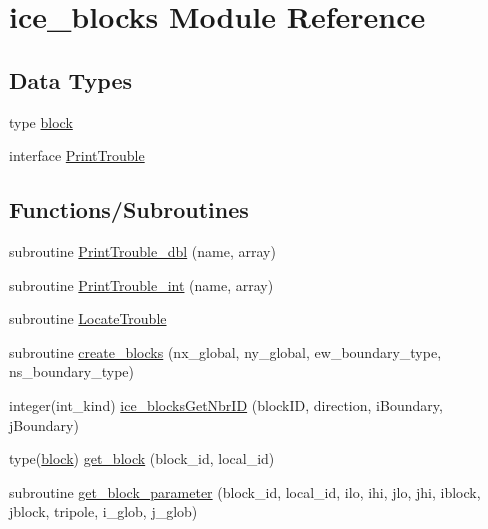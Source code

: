 \hypertarget{namespaceice__blocks}{
\section{ice\_\-blocks Module Reference}
\label{namespaceice__blocks}
}
\subsection*{Data Types}
\begin{DoxyCompactItemize}
\item 
type \hyperlink{typeice__blocks_1_1block}{block}
\item 
interface \hyperlink{interfaceice__blocks_1_1PrintTrouble}{PrintTrouble}
\end{DoxyCompactItemize}
\subsection*{Functions/Subroutines}
\begin{DoxyCompactItemize}
\item 
subroutine \hyperlink{namespaceice__blocks_a844c65de0acaeb5796d6ce421b70c5c2}{PrintTrouble\_\-dbl} (name, array)
\item 
subroutine \hyperlink{namespaceice__blocks_a4a82607c32a256c67866525e0856b864}{PrintTrouble\_\-int} (name, array)
\item 
subroutine \hyperlink{namespaceice__blocks_a5ce0e098c40801be2e5f8f25d6f6af07}{LocateTrouble}
\item 
subroutine \hyperlink{namespaceice__blocks_aa2c09eaaef43d9cec6c1596979935f76}{create\_\-blocks} (nx\_\-global, ny\_\-global, ew\_\-boundary\_\-type, ns\_\-boundary\_\-type)
\item 
integer(int\_\-kind) \hyperlink{namespaceice__blocks_a62de204811a079f1cccdcc957f0cb1ff}{ice\_\-blocksGetNbrID} (blockID, direction, iBoundary, jBoundary)
\item 
type(\hyperlink{typeice__blocks_1_1block}{block}) \hyperlink{namespaceice__blocks_aa79bfef5022683234ed1b332af17f1de}{get\_\-block} (block\_\-id, local\_\-id)
\item 
subroutine \hyperlink{namespaceice__blocks_adbbafad5aa62ed6d9fec1934f073d23e}{get\_\-block\_\-parameter} (block\_\-id, local\_\-id, ilo, ihi, jlo, jhi, iblock, jblock, tripole, i\_\-glob, j\_\-glob)
\end{DoxyCompactItemize}
